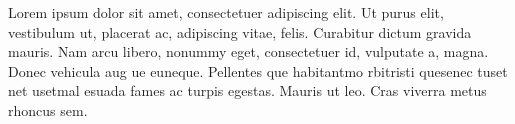 %
%

Lorem ipsum dolor sit amet, consectetuer adipiscing elit. Ut purus elit, vestibulum ut, placerat ac, adipiscing vitae, felis. Curabitur dictum gravida mauris. Nam arcu libero, nonummy eget, consectetuer id, vulputate a, magna. Donec vehicula aug ue euneque. Pellentes que habitantmo rbitristi quesenec tuset net usetmal esuada fames ac turpis egestas. Mauris ut leo. Cras viverra metus rhoncus sem.